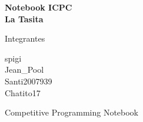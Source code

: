 \documentclass[a4paper,landscape,10pt]{article}
\begin{document}
\begin{titlepage}\centering\vspace*{1.5cm}
{\Huge\bfseries Notebook ICPC\\[0.4cm]La Tasita\par}
\vspace{0.8cm}{\LARGE Team: UPC - Turistas\par}
\vfill{\Large Integrantes\par}\vspace{0.4cm}
spigi\\
Jean\_Pool\\
Santi2007939\\
Chatito17
\vfill{\large Competitive Programming Notebook\par}\end{titlepage}
\end{document}
